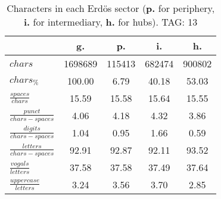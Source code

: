 \begin{table}[h!]
\begin{center}
\begin{tabular}{| l | c | c | c | c |}\hline
 & g. & p. & i. & h. \\\hline
$chars$ & 1698689  & 115413  & 682474  & 900802 \\\hline
$chars_{\%}$ & 100.00  & 6.79  & 40.18  & 53.03 \\\hline
$\frac{spaces}{chars}$ & 15.59  & 15.58  & 15.64  & 15.55 \\\hline
$\frac{punct}{chars-spaces}$ & 4.06  & 4.18  & 4.32  & 3.86 \\\hline
$\frac{digits}{chars-spaces}$ & 1.04  & 0.95  & 1.66  & 0.59 \\\hline
$\frac{letters}{chars-spaces}$ & 92.91  & 92.87  & 92.11  & 93.52 \\\hline
$\frac{vogals}{letters}$ & 37.58  & 37.58  & 37.49  & 37.64 \\\hline
$\frac{uppercase}{letters}$ & 3.24  & 3.56  & 3.70  & 2.85 \\\hline
\end{tabular}
\caption{Characters in each Erd\"os sector ({{\bf p.}} for periphery, {{\bf i.}} for intermediary, 
    {{\bf h.}} for hubs). TAG: 13}
\end{center}
\end{table}